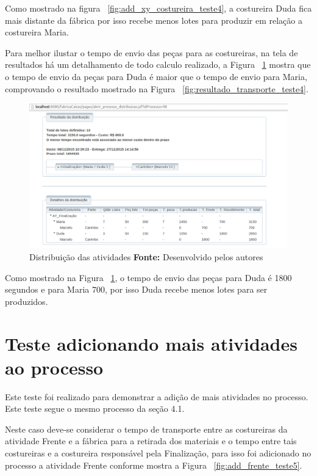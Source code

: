 \par Como mostrado na figura ~\ref{fig:add_xy_costureira_teste4}, a costureira
Duda fica mais distante da fábrica por isso recebe menos lotes para produzir em
relação a costureira Maria.

\par Para melhor ilustar o tempo de envio das peças para as costureiras, na tela
de resultados há um detalhamento de todo calculo realizado, a Figura
~\ref{fig:detalhameneto_transporte_teste4} mostra que o tempo de envio da peças para Duda é 
maior que o tempo de envio para Maria, comprovando o resultado mostrado na
Figura ~\ref{fig:resultado_transporte_teste4}.

\begin{figure}[h!]
	\centerline{\includegraphics[scale=0.3]{./imagens/detalhamento_transporte_teste4.png}}
	\caption[Distribuição das atividades]
	{Distribuição das atividades \textbf{Fonte:} Desenvolvido pelos autores}
	\label{fig:detalhameneto_transporte_teste4}
\end{figure}

\par Como mostrado na Figura ~\ref{fig:detalhameneto_transporte_teste4}, o tempo
de envio das peças para Duda é 1800 segundos e para Maria 700, por isso
Duda recebe menos lotes para ser produzidos.


\section{Teste adicionando mais atividades ao processo}

\par Este teste foi realizado para demonstrar a adição de mais atividades no
processo. Este teste segue o mesmo processo da seção 4.1.

\par Neste caso deve-se considerar o tempo de transporte entre as costureiras da atividade Frente e a fábrica 
para a retirada dos materiais e o tempo entre tais costureiras e a costureira
responsável pela Finalização, para isso foi adicionado no processo a atividade
Frente conforme mostra a Figura ~\ref{fig:add_frente_teste5}.

